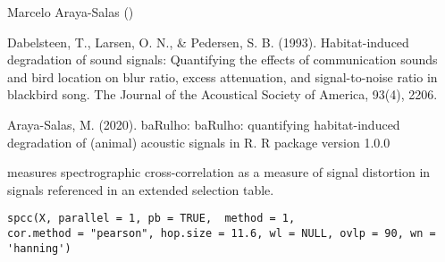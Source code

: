 \documentclass[letterpaper]{book}
\begin{document}
%
\begin{Author}\relax
Marcelo Araya-Salas ()
\end{Author}
%
\begin{References}\relax

Dabelsteen, T., Larsen, O. N., \& Pedersen, S. B. (1993). Habitat-induced degradation of sound signals: Quantifying the effects of communication sounds and bird location on blur ratio, excess attenuation, and signal-to-noise ratio in blackbird song. The Journal of the Acoustical Society of America, 93(4), 2206.

Araya-Salas, M. (2020). baRulho: baRulho: quantifying habitat-induced degradation of (animal) acoustic signals in R. R package version 1.0.0

\end{References}
%
\begin{SeeAlso}\relax
{}
\end{SeeAlso}
%
\begin{Examples}
\end{Examples}
%
\begin{Description}\relax
{} measures spectrographic cross-correlation as a measure of signal distortion in signals referenced in an extended selection table.
\end{Description}
%
\begin{Usage}
\begin{verbatim}
spcc(X, parallel = 1, pb = TRUE,  method = 1, 
cor.method = "pearson", hop.size = 11.6, wl = NULL, ovlp = 90, wn = 'hanning')
\end{verbatim}
\end{Usage}
%
\end{document}
